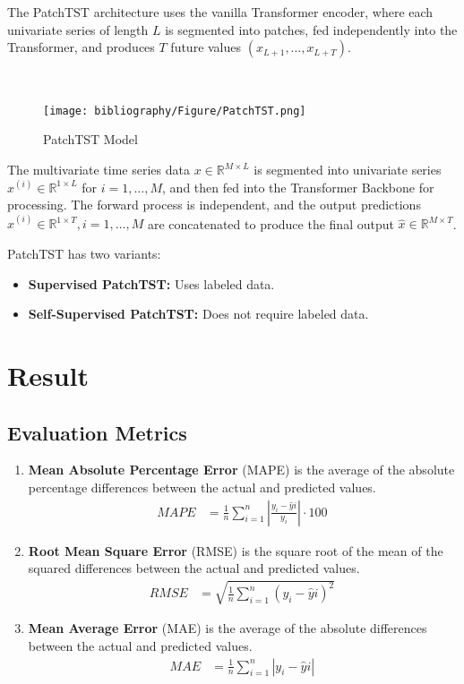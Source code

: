\documentclass{ieeeojies}
\begin{document}
The PatchTST architecture uses the vanilla Transformer encoder, where each univariate series of length \( L \) is segmented into patches, fed independently into the Transformer, and produces \( T \) future values \( (x_{L+1}, \ldots, x_{L+T}) \).

\ 
\\
\begin{figure}[H]
    \centering
    \texttt{[image: bibliography/Figure/PatchTST.png]}
    \caption{PatchTST Model}
    \label{fig:PatchTST_Model}
\end{figure}
The multivariate time series data \( x \in \mathbb{R}^{M \times L} \) is segmented into univariate series \( x^{(i)} \in \mathbb{R}^{1 \times L} \) for \( i = 1, \ldots, M \), and then fed into the Transformer Backbone for processing. The forward process is independent, and the output predictions \( \hat{x}^{(i)} \in \mathbb{R}^{1 \times T}, i = 1, \ldots, M \) are concatenated to produce the final output \( \hat{x} \in \mathbb{R}^{M \times T} \).

PatchTST has two variants:
\begin{itemize}
    \item \textbf{Supervised PatchTST:} Uses labeled data.
    \item \textbf{Self-Supervised PatchTST:} Does not require labeled data.
\end{itemize}
\section{Result}
\subsection{Evaluation Metrics}
\begin{enumerate}
    \item \textbf{Mean Absolute Percentage Error} (MAPE) is the average of the absolute percentage differences between the actual and predicted values.
    \begin{align*}
    MAPE &= \frac{1}{n} \sum_{i=1}^n \left|\frac{y_i - \hat{y}i}{y_i}\right| \cdot 100 \
    \end{align*}
    \item \textbf{Root Mean Square Error} (RMSE) is the square root of the mean of the squared differences between the actual and predicted values.
    \begin{align*}
    RMSE &= \sqrt{\frac{1}{n} \sum_{i=1}^n (y_i - \hat{y}i)^2} \
    \end{align*}
    \item \textbf{Mean Average Error} (MAE) is the average of the absolute differences between the actual and predicted values.
    \begin{align*}
    MAE &= \frac{1}{n} \sum_{i=1}^n |y_i - \hat{y}i| \
    \end{align*}
\end{enumerate}
\end{document}
